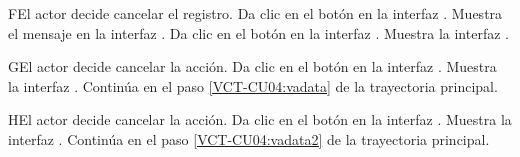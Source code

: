 \begin{UCtrayectoriaA}{F}{El actor decide cancelar el registro.}
	\UCpaso [\UCactor] Da clic en el botón  en la interfaz .
	\UCpaso [\UCsist] Muestra el mensaje  en la interfaz .
	\UCpaso [\UCactor] Da clic en el botón  en la interfaz .
	\UCpaso [\UCsist] Muestra la interfaz .
\end{UCtrayectoriaA} 

\begin{UCtrayectoriaA}{G}{El actor decide cancelar la acción.}
	\UCpaso [\UCactor] Da clic en el botón  en la interfaz .
	\UCpaso [\UCsist] Muestra la interfaz .
	\UCpaso [\UCsist] Continúa en el paso \ref{VCT-CU04:vadata} de la trayectoria principal.
\end{UCtrayectoriaA} 

\begin{UCtrayectoriaA}{H}{El actor decide cancelar la acción.}
	\UCpaso [\UCactor] Da clic en el botón  en la interfaz .
	\UCpaso [\UCsist] Muestra la interfaz .
	\UCpaso [\UCsist] Continúa en el paso \ref{VCT-CU04:vadata2} de la trayectoria principal.
\end{UCtrayectoriaA} 